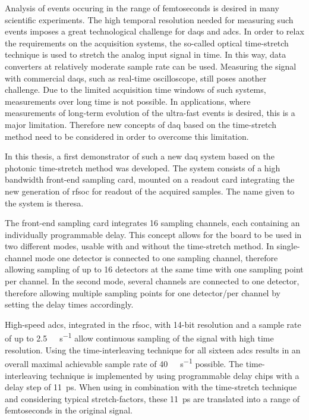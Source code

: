 Analysis of events occuring in the range of femtoseconds is desired in many scientific experiments.
The high temporal resolution needed for measuring such events imposes a great technological challenge for \glspl{daq} and \glspl{adc}.
In order to relax the requirements on the acquisition systems, the so-called optical time-stretch technique is used to stretch the analog input signal in time.
In this way, data converters at relatively moderate sample rate can be used.
Measuring the signal with commercial \glspl{daq}, such as real-time oscilloscope, still poses another challenge.
Due to the limited acquisition time windows of such systems, measurements over long time is not possible.
In applications, where measurements of long-term evolution of the ultra-fast events is desired, this is a major limitation.
Therefore new concepts of \gls{daq} based on the time-stretch method need to be considered in order to overcome this limitation. 

In this thesis, a first demonstrator of such a new \gls{daq} system based on the photonic time-stretch method was developed.
The system consists of a high bandwidth front-end sampling card, mounted on a readout card integrating the new generation of \gls{rfsoc} for readout of the acquired samples. The name given to the system is \gls{theresa}.

The front-end sampling card integrates 16 sampling channels, each containing an individually programmable delay. 
This concept allows for the board to be used in two different modes, usable with and without the time-stretch method.
In single-channel mode one detector is connected to one sampling channel, therefore allowing sampling of up to 16 detectors at the same time with one sampling point per channel.
In the second mode, several channels are connected to one detector, therefore allowing multiple sampling points for one detector/per channel by setting the delay times accordingly. 

High-speed \glspl{adc}, integrated in the \gls{rfsoc}, with 14-bit resolution and a sample rate of up to \SI{2.5}{\giga \sample \per \second} allow continuous sampling of the signal with high time resolution. 
Using the time-interleaving technique for all sixteen \glspl{adc} results in an overall maximal achievable sample rate of \SI{40}{\giga \sample \per \second} possible. 
The time-interleaving technique is implemented by using programmable delay chips with a delay step of \SI{11}{\pico \second}. 
When using in combination with the time-stretch technique and considering typical stretch-factors, these \SI{11}{\pico \second} are translated into a range of femtoseconds in the original signal.

